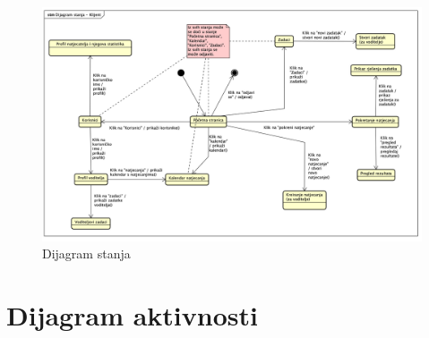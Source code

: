 \begin{figure}[H]
	\includegraphics[scale=0.41]{dijagrami/DijagramStanja.png}
	\centering
	\caption{Dijagram stanja}
	\label{fig:dijagramStanja}
\end{figure}

\eject
%
\section{Dijagram aktivnosti}

